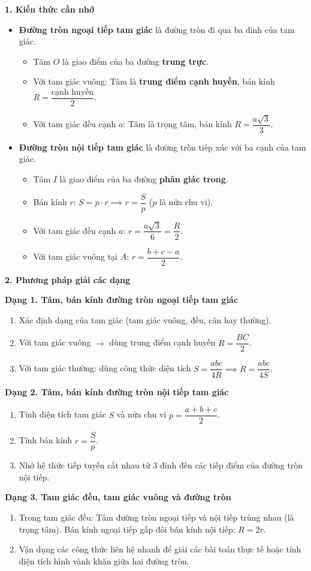 \textbf{1. Kiến thức cần nhớ}
\begin{itemize}
\item \textbf{Đường tròn ngoại tiếp tam giác} là đường tròn đi qua ba đỉnh của tam giác.
\begin{itemize}
\item Tâm $O$ là giao điểm của ba đường \textbf{trung trực}.
\item Với tam giác vuông: Tâm là \textbf{trung điểm cạnh huyền}, bán kính $\boxed{R = \dfrac{\text{cạnh huyền}}{2}}$.
\item Với tam giác đều cạnh $a$: Tâm là trọng tâm, bán kính $\boxed{R = \dfrac{a\sqrt{3}}{3}}$.
\end{itemize}
\item \textbf{Đường tròn nội tiếp tam giác} là đường tròn tiếp xúc với ba cạnh của tam giác.
\begin{itemize}
\item Tâm $I$ là giao điểm của ba đường \textbf{phân giác trong}.
\item Bán kính $r$: $\boxed{S = p \cdot r \implies r = \dfrac{S}{p}}$ ($p$ là nửa chu vi).
\item Với tam giác đều cạnh $a$: $\boxed{r = \dfrac{a\sqrt{3}}{6}} = \dfrac{R}{2}$.
\item Với tam giác vuông tại $A$: $\boxed{r = \dfrac{b + c - a}{2}}$.
\end{itemize}
\end{itemize}

\textbf{2. Phương pháp giải các dạng}

\textbf{Dạng 1. Tâm, bán kính đường tròn ngoại tiếp tam giác}
\begin{enumerate}
\item Xác định dạng của tam giác (tam giác vuông, đều, cân hay thường).
\item Với tam giác vuông $\rightarrow$ dùng trung điểm cạnh huyền $R = \dfrac{BC}{2}$.
\item Với tam giác thường: dùng công thức diện tích $S = \dfrac{abc}{4R} \implies R = \dfrac{abc}{4S}$.
\end{enumerate}

\textbf{Dạng 2. Tâm, bán kính đường tròn nội tiếp tam giác}
\begin{enumerate}
\item Tính diện tích tam giác $S$ và nửa chu vi $p = \dfrac{a+b+c}{2}$.
\item Tính bán kính $r = \dfrac{S}{p}$.
\item Nhớ hệ thức tiếp tuyến cắt nhau từ $3$ đỉnh đến các tiếp điểm của đường tròn nội tiếp.
\end{enumerate}

\textbf{Dạng 3. Tam giác đều, tam giác vuông và đường tròn}
\begin{enumerate}
\item Trong tam giác đều: Tâm đường tròn ngoại tiếp và nội tiếp trùng nhau (là trọng tâm). Bán kính ngoại tiếp gấp đôi bán kính nội tiếp: $\boxed{R = 2r}$.
\item Vận dụng các công thức liên hệ nhanh để giải các bài toán thực tế hoặc tính diện tích hình vành khăn giữa hai đường tròn.
\end{enumerate}
